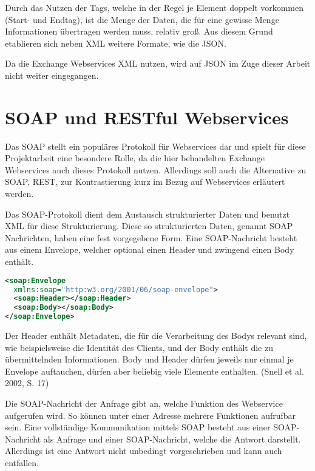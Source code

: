 Durch das Nutzen der Tags, welche in der Regel je Element doppelt vorkommen (Start- und Endtag), ist die Menge der Daten, die für eine gewisse Menge Informationen übertragen werden muss, relativ groß. Aus diesem Grund etablieren sich neben \ac{XML} weitere Formate, wie die \ac{JSON}. \cite[S. 226]{Jager.2008}

Da die Exchange Webservices \ac{XML} nutzen, wird auf \ac{JSON} im Zuge dieser Arbeit nicht weiter eingegangen. 

\section{SOAP und RESTful Webservices}
\label{sec:SOAP}
Das \ac{SOAP} stellt ein populäres Protokoll für Webservices dar \cite[S. 5]{Burbiel.2007} und spielt für diese Projektarbeit eine besondere Rolle, da die hier behandelten Exchange Webservices auch dieses Protokoll nutzen. Allerdings soll auch die Alternative zu \ac{SOAP}, \ac{REST}, zur Kontrastierung kurz im Bezug auf Webservices erläutert werden.

Das \ac{SOAP}-Protokoll dient dem Austausch strukturierter Daten und benutzt \ac{XML} für diese Strukturierung. \cite{Gudgin.2007} Diese so strukturierten Daten, genannt \ac{SOAP} Nachrichten, haben eine fest vorgegebene Form. Eine \ac{SOAP}-Nachricht besteht aus einem Envelope, welcher optional einen Header und zwingend einen Body enthält.
 
\begin{lstlisting}[language=XML]
<soap:Envelope
  xmlns:soap="http:w3.org/2001/06/soap-envelope">
  <soap:Header></soap:Header>
  <soap:Body></soap:Body>
</soap:Envelope>
\end{lstlisting}

Der Header enthält Metadaten, die für die Verarbeitung des Bodys relevant sind, wie beispielsweise die Identität des Clients, \cite[S. 16]{Snell.2002} und der Body enthält die zu übermittelnden Informationen. \cite{Gudgin.2007} Body und Header dürfen jeweils nur einmal je Envelope auftauchen, dürfen aber beliebig viele Elemente enthalten. (Snell et al. 2002, S. 17)

Die \ac{SOAP}-Nachricht der Anfrage gibt an, welche Funktion des Webservice aufgerufen wird. \cite[S. 28]{Snell.2002} So können unter einer Adresse mehrere Funktionen aufrufbar sein. \cite{Gudgin.2007}
Eine vollständige Kommunikation mittels \ac{SOAP} besteht aus einer \ac{SOAP}-Nachricht als Anfrage und einer \ac{SOAP}-Nachricht, welche die Antwort darstellt. Allerdings ist eine Antwort nicht unbedingt vorgeschrieben und kann auch entfallen. \cite[S. 17]{Snell.2002} 

